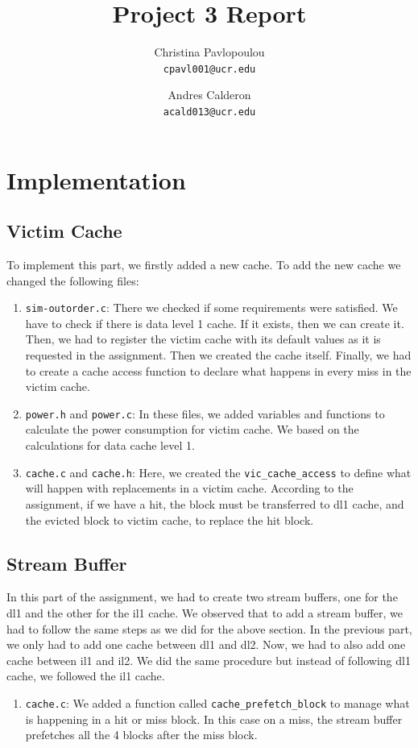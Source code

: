 \documentclass[10pt]{scrartcl}
\title{Project 3 Report}
\author{
   Christina Pavlopoulou\\
  \small \texttt{cpavl001@ucr.edu}
  \and
   Andres Calderon\\
  \small \texttt{acald013@ucr.edu}
}
\begin{document}
\maketitle

\section{Implementation}
\subsection{Victim Cache}
To implement this part, we firstly added a new cache. To add the new cache we changed the following files:
\begin{enumerate}
 \item \texttt{sim-outorder.c}: There we checked if some requirements were satisfied.  We have to check if there is data level 1 cache. If it exists, then we can create it. Then, we had to register the victim cache with its default values as it is requested in the assignment. Then we created the cache itself.  Finally, we had to create a cache access function to declare what happens in every miss in the victim cache.
 \item \texttt{power.h} and \texttt{power.c}: In these files, we added variables and functions to calculate the power consumption for victim cache. We based on the calculations for data cache level 1. 
 \item \texttt{cache.c} and \texttt{cache.h}: Here, we created the \texttt{vic\_cache\_access} to define what will happen with replacements in a victim cache. According to the assignment, if we have a hit, the block must be transferred to dl1 cache, and the evicted block to victim cache, to replace the hit block. 
\end{enumerate}

\subsection{Stream Buffer}
In this part of the assignment, we had to create two stream buffers, one for the dl1 and the other for the il1 cache. We observed that to add a stream buffer, we had to follow the same steps as we did for the above section. In the previous part, we only had to add one cache between dl1 and dl2. Now, we had to also add one cache between il1 and il2. We did the same procedure but instead of following dl1 cache, we followed the il1 cache. 

\begin{enumerate}
\item \texttt{cache.c}: We added a function called \texttt{cache\_prefetch\_block} to manage what is happening in a hit or miss block. In this case on a miss, the stream buffer prefetches all the 4 blocks after the miss block. 
\end{enumerate}
\end{document}
